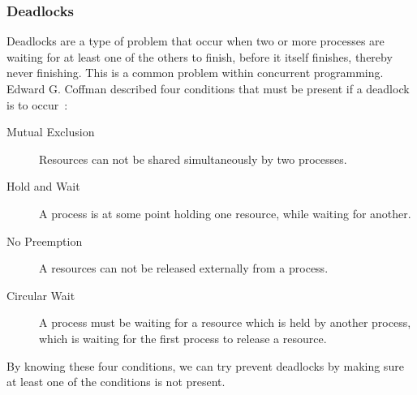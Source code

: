 \subsubsection{Deadlocks}

Deadlocks are a type of problem that occur when two or more processes are waiting for at least one of the others to finish, before it itself finishes, thereby never finishing. This is a common problem within concurrent programming. Edward G. Coffman described four conditions that must be present if a deadlock is to occur~\cite{Coffman:1971}:

\begin{description}
\item[Mutual Exclusion] Resources can not be shared simultaneously by two processes.
\item[Hold and Wait] A process is at some point holding one resource, while waiting for another.
\item[No Preemption] A resources can not be released externally from a process.
\item[Circular Wait] A process must be waiting for a resource which is held by another process, which is waiting for the first process to release a resource.
\end{description}

By knowing these four conditions, we can try prevent deadlocks by making sure at least one of the conditions is not present.
